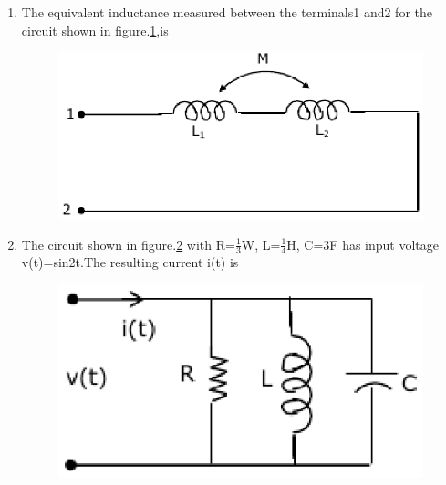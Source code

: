 \documentclass[journal,12pt,twocolumn]{IEEEtran}
\begin{document}
\begin{enumerate}
\item The equivalent inductance measured between the terminals1 and2 for the circuit shown in figure.\ref{fig51},is
\begin{enumerate}
\setlength\itemsep{2em}
\begin{figure}[!h]
\begin{center}
\includegraphics[scale=0.7]{./figs/fig51.eps}
\caption{}
\label{fig51}
\end{center}
\end{figure}
\end{enumerate}

\item The circuit shown in figure.\ref{fig52} with R=$\frac{1}{3}$W, L=$\frac{1}{4}$H, C=3F has input voltage v(t)=sin2t.The resulting current i(t) is
\begin{enumerate}
\setlength\itemsep{2em}
\begin{figure}[!h]
\begin{center}
\includegraphics[scale=0.7]{./figs/fig52.eps}
\caption{}
\label{fig52}
\end{center}
\end{figure}
\end{enumerate}


\end{enumerate}
\end{document}
